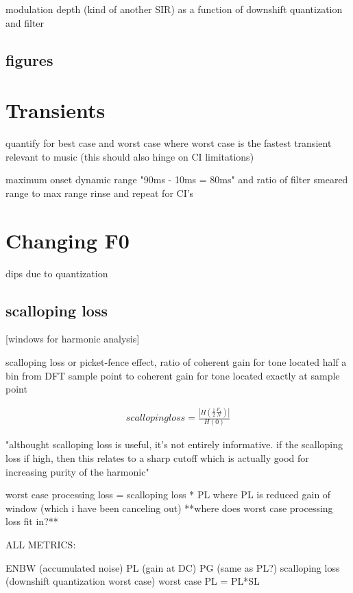 \documentclass [11pt, proquest] {uwthesis}[2015/03/03]
\begin{document}
modulation depth (kind of another SIR) as a function of downshift quantization and filter

\subsection{figures}

\section{Transients}

quantify for best case and worst case where worst case is the fastest transient relevant to music (this should also hinge on CI limitations)

maximum onset dynamic range "90ms - 10ms = 80ms"
and ratio of filter smeared range to max range
rinse and repeat for CI's

\section{Changing F0}

dips due to quantization

\subsection{scalloping loss}

[windows for harmonic analysis]

scalloping loss or picket-fence effect, ratio of coherent gain for tone located half a bin from DFT sample point to coherent gain for tone located exactly at sample point

\begin{align}
scalloping loss = \frac{| H(\frac{1}{2} \frac{F_s}{N}) |}{H(0)}
\end{align}

"althought scalloping loss is useful, it's not entirely informative.  if the scalloping loss if high, then this relates to a sharp cutoff which is actually good for increasing purity of the harmonic"

worst case processing loss = scalloping loss * PL
where PL is reduced gain of window (which i have been canceling out)
**where does worst case processing loss fit in?**



ALL METRICS:

ENBW (accumulated noise)
PL (gain at DC)
PG (same as PL?)
scalloping loss (downshift quantization worst case)
worst case PL = PL*SL
\end{document}
